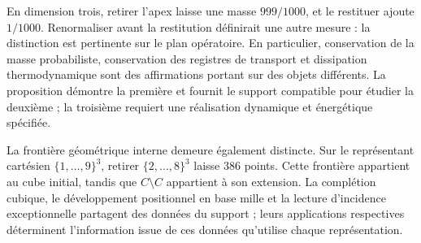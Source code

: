 En dimension trois, retirer l'apex laisse une masse \(999/1000\), et
le restituer ajoute \(1/1000\). Renormaliser avant la restitution
définirait une autre mesure : la distinction est pertinente sur le plan opératoire.
En particulier, conservation de la masse probabiliste, conservation des
registres de transport et dissipation thermodynamique sont des affirmations portant sur
des objets différents. La proposition démontre la première et fournit le
support compatible pour étudier la deuxième ; la troisième requiert une
réalisation dynamique et énergétique spécifiée.

La frontière géométrique interne demeure également distincte.
Sur le représentant cartésien \(\{1,\ldots,9\}^3\), retirer
\(\{2,\ldots,8\}^3\) laisse \(386\) points. Cette frontière appartient au
cube initial, tandis que \(\widehat C\setminus C\) appartient à son
extension. La complétion cubique, le développement positionnel en base mille et
la lecture d'incidence exceptionnelle partagent des données du support ;
leurs applications respectives déterminent l'information issue de ces données qu'utilise
chaque représentation.
